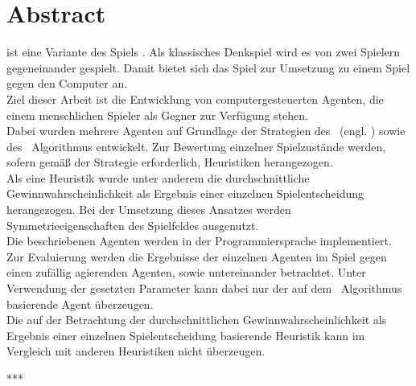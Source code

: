\chapter*{Abstract}
\authormax
\mxZitat{\ot} ist eine Variante des Spiels . Als klassisches Denkspiel wird es von zwei Spielern gegeneinander gespielt. Damit bietet sich das Spiel zur Umsetzung zu einem Spiel gegen den Computer an.
\\Ziel dieser Arbeit ist die Entwicklung von computergesteuerten Agenten, die einem menschlichen Spieler als Gegner zur Verfügung stehen.
\\Dabei wurden mehrere Agenten auf Grundlage der Strategien des \abab\ (engl. \mxZitat{\abp}) sowie des \mc\ Algorithmus entwickelt. Zur Bewertung einzelner Spielzustände werden, sofern gemäß der Strategie erforderlich, Heuristiken herangezogen.
\\Als eine Heuristik wurde unter anderem die durchschnittliche Gewinnwahrscheinlichkeit als Ergebnis einer einzelnen Spielentscheidung herangezogen. Bei der Umsetzung dieses Ansatzes werden Symmetrieeigenschaften des Spielfeldes ausgenutzt.
\\Die beschriebenen Agenten werden in der Programmiersprache  implementiert.
\\Zur Evaluierung werden die Ergebnisse der einzelnen Agenten im Spiel gegen einen zufällig agierenden Agenten, sowie untereinander betrachtet. Unter Verwendung der gesetzten Parameter kann dabei nur der auf dem \mc\ Algorithmus basierende Agent überzeugen.
\\Die auf der Betrachtung der durchschnittlichen Gewinnwahrscheinlichkeit als Ergebnis einer einzelnen Spielentscheidung basierende Heuristik kann im Vergleich mit anderen Heuristiken nicht überzeugen.

\begin{center}
***
\end{center}